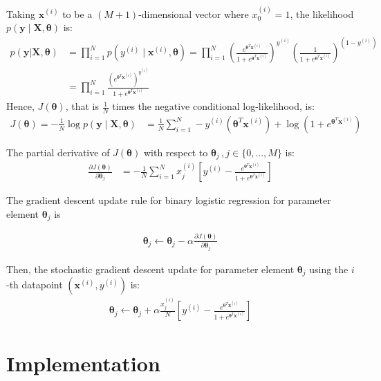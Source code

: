 \documentclass[11pt,addpoints,answers]{exam}
\newcommand{\xv}{\mathbf{x}}
\newcommand{\yv}{\mathbf{y}}
\newcommand{\thetav     }{\boldsymbol \theta     }
\begin{document}
Taking $\xv^{\left(i\right)}$ to be a $(M+1)$-dimensional vector where $x^{(i)}_0=1$, the likelihood $p\left(\yv \mid \mathbf{X},\thetav\right)$ is:
\begin{align}
     p(\yv |\mathbf{X},\thetav) &= \prod_{i = 1}^N p(y^{(i)} \mid  \xv^{(i)}, \thetav) = \prod_{i = 1}^N \left(\frac{e^{\thetav^T\xv^{\left(i\right)}}}{1+e^{\thetav^T\xv^{\left(i\right)}}}\right)^{y^{(i)}}\left(\frac{1}{1+e^{\thetav^T\xv^{\left(i\right)}}}\right)^{\left(1-y^{(i)}\right)}\\
    &= \prod_{i=1}^N \frac{\left(e^{\thetav^T\xv^{\left(i\right)}}\right)^{y^{(i)}}}{1+e^{\thetav^T\xv^{\left(i\right)}}}
\end{align}
Hence, $J(\thetav)$, that is $\frac{1}{N}$ times the negative conditional log-likelihood, is:
\begin{align}
    J(\thetav)= - \frac{1}{N} \log p\left(\yv \mid \mathbf{X},\thetav\right) &= \frac{1}{N}\sum_{i=1}^N  -y^{(i)}\left(\thetav^T\xv^{\left(i\right)}\right)+\log\left(1+e^{\thetav^T\xv^{\left(i\right)}}\right)
\end{align}


The partial derivative of $J(\thetav)$ with respect to $\thetav_j \,, j\in\{0,...,M\}$ is:
\begin{align}
    \frac{\partial J(\thetav)}{\partial \thetav_j} &= -\frac{1}{N} \sum_{i=1}^N x_j^{\left(i\right)}\left[y^{(i)}-\frac{e^{\thetav^T\xv^{\left(i\right)}}}{1+e^{\thetav^T\xv^{\left(i\right)}}}\right]
\end{align}


The gradient descent update rule  for binary logistic regression for parameter element $\thetav_j$ is

\begin{align}
    \thetav_j \leftarrow \thetav_j - \alpha \frac{\partial J(\thetav)}{\partial \thetav_j}
\end{align}


Then, the stochastic gradient descent update for  parameter element $\thetav_j$ using the $i$-th datapoint $(\xv^{(i)},y^{(i)})$ is:
\begin{align}
    \thetav_j \leftarrow \thetav_j + \alpha \frac{x_j^{\left(i\right)}}{N} \left[y^{(i)}-\frac{e^{\thetav^T\xv^{\left(i\right)}}}{1+e^{\thetav^T\xv^{\left(i\right)}}}\right]
\end{align}
 


\section{Implementation}
\end{document}
